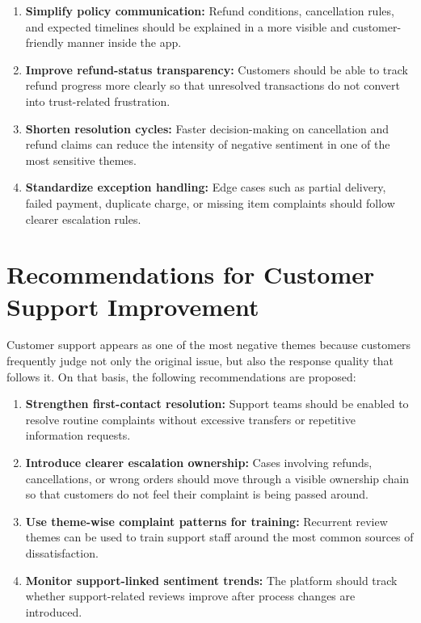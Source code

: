 \begin{enumerate}[label=\arabic*.]
    \item \textbf{Simplify policy communication:} Refund conditions, cancellation rules, and expected timelines should be explained in a more visible and customer-friendly manner inside the app.
    \item \textbf{Improve refund-status transparency:} Customers should be able to track refund progress more clearly so that unresolved transactions do not convert into trust-related frustration.
    \item \textbf{Shorten resolution cycles:} Faster decision-making on cancellation and refund claims can reduce the intensity of negative sentiment in one of the most sensitive themes.
    \item \textbf{Standardize exception handling:} Edge cases such as partial delivery, failed payment, duplicate charge, or missing item complaints should follow clearer escalation rules.
\end{enumerate}

\section{Recommendations for Customer Support Improvement}

Customer support appears as one of the most negative themes because customers frequently judge not only the original issue, but also the response quality that follows it. On that basis, the following recommendations are proposed:

\begin{enumerate}[label=\arabic*.]
    \item \textbf{Strengthen first-contact resolution:} Support teams should be enabled to resolve routine complaints without excessive transfers or repetitive information requests.
    \item \textbf{Introduce clearer escalation ownership:} Cases involving refunds, cancellations, or wrong orders should move through a visible ownership chain so that customers do not feel their complaint is being passed around.
    \item \textbf{Use theme-wise complaint patterns for training:} Recurrent review themes can be used to train support staff around the most common sources of dissatisfaction.
    \item \textbf{Monitor support-linked sentiment trends:} The platform should track whether support-related reviews improve after process changes are introduced.
\end{enumerate}

